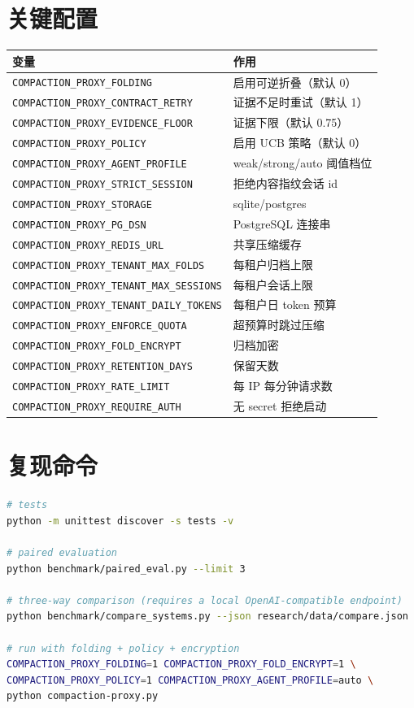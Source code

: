 \documentclass[11pt,a4paper]{ctexart}
\begin{document}
\section{关键配置}
\begin{longtable}{p{6.2cm}p{8.2cm}}
\toprule
变量 & 作用 \\
\midrule
\texttt{COMPACTION\_PROXY\_FOLDING} & 启用可逆折叠（默认 0） \\
\texttt{COMPACTION\_PROXY\_CONTRACT\_RETRY} & 证据不足时重试（默认 1） \\
\texttt{COMPACTION\_PROXY\_EVIDENCE\_FLOOR} & 证据下限（默认 0.75） \\
\texttt{COMPACTION\_PROXY\_POLICY} & 启用 UCB 策略（默认 0） \\
\texttt{COMPACTION\_PROXY\_AGENT\_PROFILE} & weak/strong/auto 阈值档位 \\
\texttt{COMPACTION\_PROXY\_STRICT\_SESSION} & 拒绝内容指纹会话 id \\
\texttt{COMPACTION\_PROXY\_STORAGE} & sqlite/postgres \\
\texttt{COMPACTION\_PROXY\_PG\_DSN} & PostgreSQL 连接串 \\
\texttt{COMPACTION\_PROXY\_REDIS\_URL} & 共享压缩缓存 \\
\texttt{COMPACTION\_PROXY\_TENANT\_MAX\_FOLDS} & 每租户归档上限 \\
\texttt{COMPACTION\_PROXY\_TENANT\_MAX\_SESSIONS} & 每租户会话上限 \\
\texttt{COMPACTION\_PROXY\_TENANT\_DAILY\_TOKENS} & 每租户日 token 预算 \\
\texttt{COMPACTION\_PROXY\_ENFORCE\_QUOTA} & 超预算时跳过压缩 \\
\texttt{COMPACTION\_PROXY\_FOLD\_ENCRYPT} & 归档加密 \\
\texttt{COMPACTION\_PROXY\_RETENTION\_DAYS} & 保留天数 \\
\texttt{COMPACTION\_PROXY\_RATE\_LIMIT} & 每 IP 每分钟请求数 \\
\texttt{COMPACTION\_PROXY\_REQUIRE\_AUTH} & 无 secret 拒绝启动 \\
\bottomrule
\end{longtable}

\section{复现命令}
\begin{lstlisting}[language=bash]
# tests
python -m unittest discover -s tests -v

# paired evaluation
python benchmark/paired_eval.py --limit 3

# three-way comparison (requires a local OpenAI-compatible endpoint)
python benchmark/compare_systems.py --json research/data/compare.json

# run with folding + policy + encryption
COMPACTION_PROXY_FOLDING=1 COMPACTION_PROXY_FOLD_ENCRYPT=1 \
COMPACTION_PROXY_POLICY=1 COMPACTION_PROXY_AGENT_PROFILE=auto \
python compaction-proxy.py
\end{lstlisting}
\end{document}
